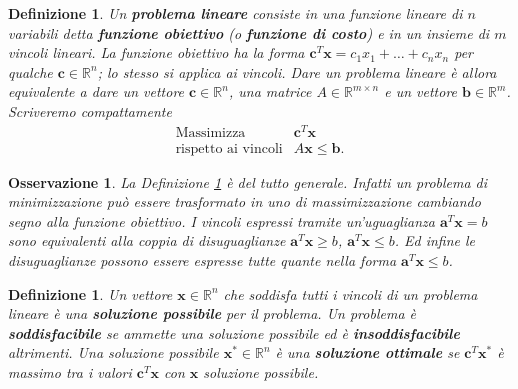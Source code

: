 \documentclass[italian, letter paper, 12pt, reqno]{article}
\theoremstyle{myteo}
\newtheorem{definition}[theorem]{Definizione}
\newtheorem{remark}[theorem]{Osservazione}
\numberwithin{equation}{section}
\begin{document}
\begin{definition}
  \label{def:problema_lineare}
  Un \textbf{problema lineare} consiste in una funzione lineare di \(n\) variabili detta \textbf{funzione obiettivo} (o \textbf{funzione di costo}) e in un insieme di \(m\) vincoli lineari.
  La funzione obiettivo ha la forma \(\mathbf{c}^T\mathbf{x} = c_1x_1+\ldots+c_nx_n\) per qualche \(\mathbf{c}\in\mathbb{R}^n\); lo stesso si applica ai vincoli.
  Dare un problema lineare è allora equivalente a dare un vettore \(\mathbf{c}\in\mathbb{R}^n\), una matrice \(A\in\mathbb{R}^{m\times n}\) e un vettore \(\mathbf{b}\in\mathbb{R}^m\).
  Scriveremo compattamente
  \begin{equation*}
    \begin{array}{ll}
      \text{Massimizza} & \mathbf{c}^T\mathbf{x}\\
      \text{rispetto ai vincoli} & A\mathbf{x}\leq\mathbf{b}.
    \end{array}
  \end{equation*}
\end{definition}

\begin{remark}
  \label{def:definizione_generale}
  La Definizione \ref{def:problema_lineare} è del tutto generale.
  Infatti un problema di minimizzazione può essere trasformato in uno di massimizzazione cambiando segno alla funzione obiettivo.
  I vincoli espressi tramite un'uguaglianza \(\mathbf{a}^T\mathbf{x}=b\) sono equivalenti alla coppia di disuguaglianze \(\mathbf{a}^T\mathbf{x}\geq b\), \(\mathbf{a}^T\mathbf{x}\leq b\).
  Ed infine le disuguaglianze possono essere espresse tutte quante nella forma \(\mathbf{a}^T\mathbf{x}\leq b\).
\end{remark}

\begin{definition}
  \label{def:soluzioni}
  Un vettore \(\mathbf{x}\in\mathbb{R}^n\) che soddisfa tutti i vincoli di un problema lineare è una \textbf{soluzione possibile} per il problema.
  Un problema è \textbf{soddisfacibile} se ammette una soluzione possibile ed è \textbf{insoddisfacibile} altrimenti. Una soluzione possibile \(\mathbf{x}^*\in\mathbb{R}^n\) è una \textbf{soluzione ottimale} se \(\mathbf{c}^T\mathbf{x}^*\) è massimo tra i valori \(\mathbf{c}^T\mathbf{x}\) con \(\mathbf{x}\) soluzione possibile.
\end{definition}
\end{document}
